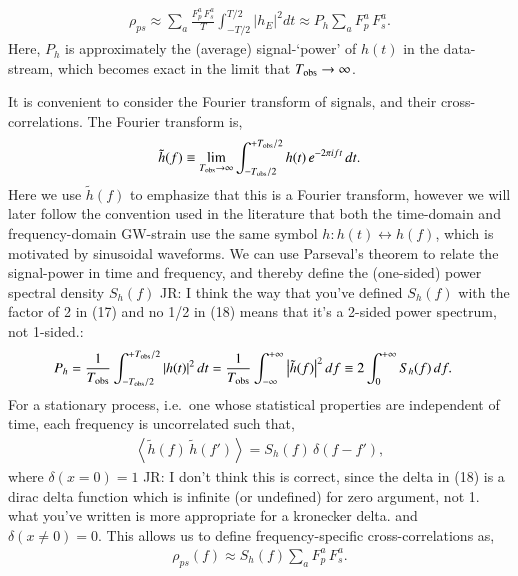 \documentclass[onecolumn,authoryear]{els-mrw}
\begin{document}
\begin{align}\label{eq:redshift-correlation-approx}
    \rho_{ps} \approx \sum_a \frac{F^a_p \, F^a_s}{T} \int_{-T/2}^{T/2} \big| h_{E} \big|^2 dt \approx P_h \sum_a F^a_p \, F^a_s.
\end{align}
Here, $P_h$ is approximately the (average) signal-`power' of $h(t)$ in the data-stream, which becomes exact in the limit that $T_{\textrm{obs}} \rightarrow \infty$.

It is convenient to consider the Fourier transform of signals, and their cross-correlations.  The Fourier transform is,
\begin{align}\label{eq:fourier-transform}
    \tilde{h}(f) \equiv \lim_{T_{\textrm{obs}}\rightarrow \infty} \int_{-T_{\textrm{obs}}/2}^{+T_{\textrm{obs}}/2} h(t) \, e^{-2 \pi i f t} \, d t.
\end{align}
Here we use $\tilde{h}(f)$ to emphasize that this is a Fourier transform, however we will later follow the convention used in the literature that both the time-domain and frequency-domain GW-strain use the same symbol $h: h(t) \leftrightarrow h(f)$, which is motivated by sinusoidal waveforms.  We can use Parseval's theorem to relate the signal-power in time and frequency, and thereby define the (one-sided) power spectral density $S_h(f)$ {\color{red}JR: I think the way that you've defined $S_h(f)$ with the factor of 2 in (17) and no 1/2 in (18) means that it's a 2-sided power spectrum, not 1-sided.}:
\begin{align}\label{eq:psd_fourier}
    P_h & = \frac{1}{T_{\textrm{obs}}} \int_{-T_{\textrm{obs}}/2}^{+T_{\textrm{obs}}/2} \left| h(t) \right|^2 dt = \frac{1}{T_{\textrm{obs}}} \int_{-\infty}^{+\infty} \left| \tilde{h}(f) \right|^2 df \equiv 2 \int_{0}^{+\infty} S_h(f) \, df.
\end{align}
For a stationary process, i.e.~one whose statistical properties are independent of time, each frequency is uncorrelated such that,
\begin{align}
    \left< \tilde{h}(f) \, \tilde{h}(f') \right> = S_h(f) \, \delta(f - f'),
\end{align}
where $\delta(x\!=\!0) = 1$ {\color{red}JR: I don't think this is correct, since the delta in (18) is a dirac delta function which is infinite (or undefined) for zero argument, not 1.  what you've written is more appropriate for a kronecker delta.} and $\delta(x\!\neq\!0) = 0$.  This allows us to define frequency-specific cross-correlations as,
\begin{align}\label{eq:redshift-correlation-frequency}
    \rho_{ps}(f) \approx S_h(f) \sum_a F^a_p \, F^a_s.
\end{align}
\end{document}
